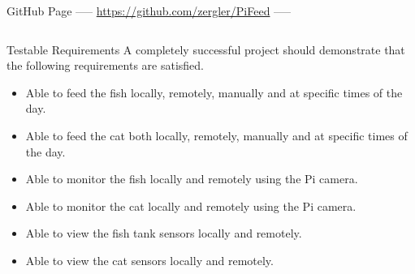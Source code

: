 \documentclass[final]{beamer}
\newlength{\onecolwid}
\newlength{\twocolwid}
\begin{document}
\begin{frame}[t]
\begin{columns}[t]
\begin{column}{\twocolwid}
\begin{columns}[t,totalwidth=\twocolwid]
\begin{column}{\onecolwid}

\end{column} %

\end{columns} %


\begin{alertblock}{GitHub Page}
    \centering
----- \url{https://github.com/zergler/PiFeed} -----

\end{alertblock} 


\begin{columns}[t,totalwidth=\twocolwid] %

\begin{column}{\onecolwid} %


\begin{block}{Testable Requirements}
A completely successful project should demonstrate that the following requirements are satisfied.
\begin{itemize}
    \item Able to feed the fish locally, remotely, manually and at specific times of the day.
    \item Able to feed the cat both locally, remotely, manually and at specific times of the day.
    \item Able to monitor the fish locally and remotely using the Pi camera.
    \item Able to monitor the cat locally and remotely using the Pi camera.
    \item Able to view the fish tank sensors locally and remotely.
    \item Able to view the cat sensors locally and remotely.
\end{itemize}


\end{block}
\end{column}
\end{columns}
\end{column}
\end{columns}
\end{frame}
\end{document}

